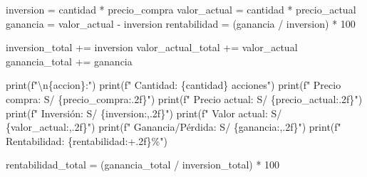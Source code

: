 \documentclass[
  doc,
  floatsintext,
  longtable,
  a4paper,
  nolmodern,
  notxfonts,
  notimes,
  12pt,
  colorlinks=true,linkcolor=blue,citecolor=blue,urlcolor=blue]{apa7}
\newenvironment{Shaded}{\begin{snugshade}}{\end{snugshade}}
\newcommand{\BuiltInTok}[1]{\textcolor[rgb]{0.00,0.23,0.31}{#1}}
\newcommand{\CharTok}[1]{\textcolor[rgb]{0.13,0.47,0.30}{#1}}
\newcommand{\DecValTok}[1]{\textcolor[rgb]{0.68,0.00,0.00}{#1}}
\newcommand{\NormalTok}[1]{\textcolor[rgb]{0.00,0.23,0.31}{#1}}
\newcommand{\OperatorTok}[1]{\textcolor[rgb]{0.37,0.37,0.37}{#1}}
\newcommand{\SpecialCharTok}[1]{\textcolor[rgb]{0.37,0.37,0.37}{#1}}
\newcommand{\SpecialStringTok}[1]{\textcolor[rgb]{0.13,0.47,0.30}{#1}}
\begin{document}
\begin{Shaded}
\begin{Highlighting}[]
\NormalTok{    inversion }\OperatorTok{=}\NormalTok{ cantidad }\OperatorTok{*}\NormalTok{ precio\_compra}
\NormalTok{    valor\_actual }\OperatorTok{=}\NormalTok{ cantidad }\OperatorTok{*}\NormalTok{ precio\_actual}
\NormalTok{    ganancia }\OperatorTok{=}\NormalTok{ valor\_actual }\OperatorTok{{-}}\NormalTok{ inversion}
\NormalTok{    rentabilidad }\OperatorTok{=}\NormalTok{ (ganancia }\OperatorTok{/}\NormalTok{ inversion) }\OperatorTok{*} \DecValTok{100}
    
\NormalTok{    inversion\_total }\OperatorTok{+=}\NormalTok{ inversion}
\NormalTok{    valor\_actual\_total }\OperatorTok{+=}\NormalTok{ valor\_actual}
\NormalTok{    ganancia\_total }\OperatorTok{+=}\NormalTok{ ganancia}
    
    \BuiltInTok{print}\NormalTok{(}\SpecialStringTok{f"}\CharTok{\textbackslash{}n}\SpecialCharTok{\{}\NormalTok{accion}\SpecialCharTok{\}}\SpecialStringTok{:"}\NormalTok{)}
    \BuiltInTok{print}\NormalTok{(}\SpecialStringTok{f"  Cantidad: }\SpecialCharTok{\{}\NormalTok{cantidad}\SpecialCharTok{\}}\SpecialStringTok{ acciones"}\NormalTok{)}
    \BuiltInTok{print}\NormalTok{(}\SpecialStringTok{f"  Precio compra: S/ }\SpecialCharTok{\{}\NormalTok{precio\_compra}\SpecialCharTok{:.2f\}}\SpecialStringTok{"}\NormalTok{)}
    \BuiltInTok{print}\NormalTok{(}\SpecialStringTok{f"  Precio actual: S/ }\SpecialCharTok{\{}\NormalTok{precio\_actual}\SpecialCharTok{:.2f\}}\SpecialStringTok{"}\NormalTok{)}
    \BuiltInTok{print}\NormalTok{(}\SpecialStringTok{f"  Inversión: S/ }\SpecialCharTok{\{}\NormalTok{inversion}\SpecialCharTok{:,.2f\}}\SpecialStringTok{"}\NormalTok{)}
    \BuiltInTok{print}\NormalTok{(}\SpecialStringTok{f"  Valor actual: S/ }\SpecialCharTok{\{}\NormalTok{valor\_actual}\SpecialCharTok{:,.2f\}}\SpecialStringTok{"}\NormalTok{)}
    \BuiltInTok{print}\NormalTok{(}\SpecialStringTok{f"  Ganancia/Pérdida: S/ }\SpecialCharTok{\{}\NormalTok{ganancia}\SpecialCharTok{:,.2f\}}\SpecialStringTok{"}\NormalTok{)}
    \BuiltInTok{print}\NormalTok{(}\SpecialStringTok{f"  Rentabilidad: }\SpecialCharTok{\{}\NormalTok{rentabilidad}\SpecialCharTok{:+.2f\}}\SpecialStringTok{\%"}\NormalTok{)}

\NormalTok{rentabilidad\_total }\OperatorTok{=}\NormalTok{ (ganancia\_total }\OperatorTok{/}\NormalTok{ inversion\_total) }\OperatorTok{*} \DecValTok{100}


\end{Highlighting}
\end{Shaded}
\end{document}
